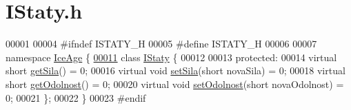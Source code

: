 \hypertarget{IStaty_8h_source}{}\section{I\+Staty.\+h}
\label{IStaty_8h_source}

\begin{DoxyCode}
00001 
00004 \textcolor{preprocessor}{#ifndef ISTATY\_H}
00005 \textcolor{preprocessor}{#define ISTATY\_H}
00006 
00007 \textcolor{keyword}{namespace }\hyperlink{namespaceIceAge}{IceAge} \{
\hypertarget{IStaty_8h_source.tex_l00011}{}\hyperlink{classIceAge_1_1IStaty}{00011}     \textcolor{keyword}{class }\hyperlink{classIceAge_1_1IStaty}{IStaty} \{
00012 
00013     \textcolor{keyword}{protected}:
00014         \textcolor{keyword}{virtual} \textcolor{keywordtype}{short} \hyperlink{classIceAge_1_1IStaty_a2cacca9736cd47f6f880a7ea11750fdc}{getSila}() = 0;
00016         \textcolor{keyword}{virtual} \textcolor{keywordtype}{void} \hyperlink{classIceAge_1_1IStaty_aa1c9b32a5fe0164dc4a04fc19b087742}{setSila}(\textcolor{keywordtype}{short} novaSila) = 0;
00018         \textcolor{keyword}{virtual} \textcolor{keywordtype}{short} \hyperlink{classIceAge_1_1IStaty_ac6644714a0dec5e4de2322e338e4495a}{getOdolnost}() = 0;
00020         \textcolor{keyword}{virtual} \textcolor{keywordtype}{void} \hyperlink{classIceAge_1_1IStaty_addca8d4cc252281aac841ec60da588fd}{setOdolnost}(\textcolor{keywordtype}{short} novaOdolnost) = 0;
00021     \};
00022 \}
00023 \textcolor{preprocessor}{#endif}
\end{DoxyCode}
